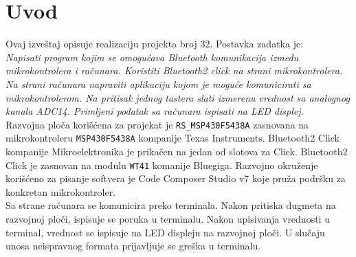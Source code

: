 \section{Uvod}

Ovaj izveštaj opisuje realizaciju projekta broj 32. Postavka zadatka je:\\

\textit{Napisati program kojim se omogućava Bluetooth komunikacija između mikrokontrolera i računara. Koristiti Bluetooth2 click na strani mikrokontrolera. Na strani računara napraviti aplikaciju kojom je moguće komunicirati sa mikrokontrolerom. Na pritisak jednog tastera slati izmerenu vrednost sa analognog kanala ADC14. Primljeni podatak sa računara ispisati na LED displej.}\\

Razvojna ploča korišćena za projekat je \verb+RS_MSP430F5438A+ zasnovana na mikrokontroleru \verb+MSP430F5438A+ kompanije Texas Instruments. Bluetooth2 Click kompanije Mikroelektronika je prikačen na jedan od slotova za Click. Bluetooth2 Click je zasnovan na modulu \verb+WT41+ komanije Bluegiga. Razvojno okruženje korišćeno za pisanje softvera je Code Composer Studio v7 koje pruža podršku za konkretan mikrokontroler.\\

Sa strane računara se komunicira preko terminala. Nakon pritiska dugmeta na razvojnoj ploči, ispisuje se poruka u terminalu. Nakon upisivanja vrednosti u terminal, vrednost se ispisuje na LED displeju na razvojnoj ploči. U slučaju unosa neispravnog formata prijavljuje se greška u terminalu.
